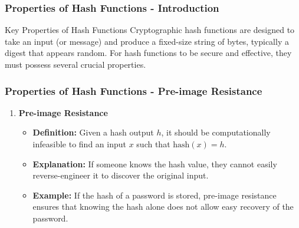 \documentclass{beamer}
\begin{document}
\begin{frame}[fragile]
    \frametitle{Properties of Hash Functions - Introduction}
    \begin{block}{Key Properties of Hash Functions}
        Cryptographic hash functions are designed to take an input (or message) and produce a fixed-size string of bytes, typically a digest that appears random. For hash functions to be secure and effective, they must possess several crucial properties.
    \end{block}
\end{frame}

\begin{frame}[fragile]
    \frametitle{Properties of Hash Functions - Pre-image Resistance}
    \begin{enumerate}
        \item \textbf{Pre-image Resistance}
        \begin{itemize}
            \item \textbf{Definition:} Given a hash output \( h \), it should be computationally infeasible to find an input \( x \) such that \( \text{hash}(x) = h \).
            \item \textbf{Explanation:} If someone knows the hash value, they cannot easily reverse-engineer it to discover the original input.
            \item \textbf{Example:} If the hash of a password is stored, pre-image resistance ensures that knowing the hash alone does not allow easy recovery of the password.
        \end{itemize}
    \end{enumerate}
\end{frame}
\end{document}

